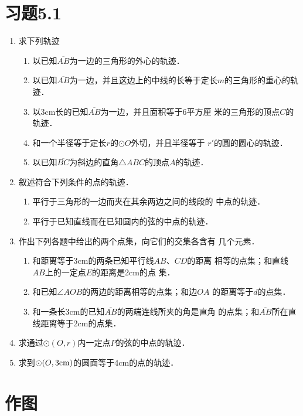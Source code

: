 \section*{习题5.1}
\begin{enumerate}
    \item 求下列轨迹
\begin{enumerate}
    \item 以已知$\overline{AB}$为一边的三角形的外心的轨迹．
    \item 以已知$\overline{AB}$为一边，并且这边上的中线的长等于定长$m$的三角形的重心的轨迹．
\item 以3cm长的已知$\overline{AB}$为一边，并且面积等于6平方厘
米的三角形的顶点$C$的轨迹．
\item 和一个半径等于定长$r$的$\odot O$外切，并且半径等于
$r'$的圆的圆心的轨迹．
\item 以已知$\overline{BC}$为斜边的直角$\triangle ABC$的顶点$A$的轨迹．
\end{enumerate}

\item 叙述符合下列条件的点的轨迹．
\begin{enumerate}
    \item 平行于三角形的一边而夹在其余两边之间的线段的
中点的轨迹．
\item 平行于已知直线而在已知圆内的弦的中点的轨迹．
\end{enumerate}
\item 作出下列各题中给出的两个点集，向它们的交集各含有
几个元素．

\begin{enumerate}
    \item 和距离等于3cm的两条已知平行线$AB$、$CD$的距离
相等的点集；和直线$AB$上的一定点$E$的距离是2cm的点
集．
\item 和已知$\angle AOB$的两边的距离相等的点集；和边$OA$
的距离等于$d$的点集．
\item 和一条长3cm的已知$\overline{AB}$的两端连线所夹的角是直角
的点集；和$\overline{AB}$所在直线距离等于2cm的点集．
\end{enumerate}


\item 求通过$\odot (O,r)$内一定点$P$的弦的中点的轨迹．
\item 求到$\odot(O,3{\rm cm})$的圆面等于4cm的点的轨迹．
\end{enumerate}

\section{作图}

